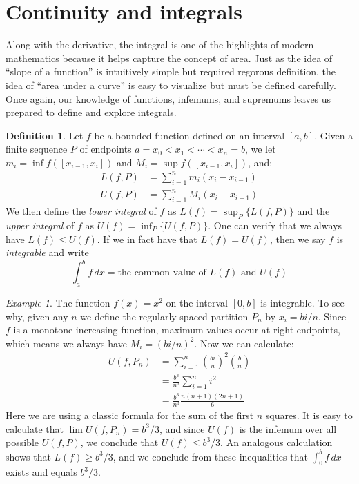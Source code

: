 \documentclass[11pt,oneside]{amsbook}
\theoremstyle{definition}
\theoremstyle{plain}
\theoremstyle{definition}
\newtheorem{defn}[thm]{Definition}
\theoremstyle{remark}
\newtheorem{example}[thm]{Example}
\numberwithin{equation}{section}
\numberwithin{figure}{section}
\begin{document}
\newpage
\section{Continuity and integrals}

Along with the derivative, the integral is one of the highlights of modern mathematics because it helps capture the concept of area. Just as the idea of ``slope of a function'' is intuitively simple but required regorous definition, the idea of ``area under a curve'' is easy to visualize but must be defined carefully. Once again, our knowledge of functions, infemums, and supremums leaves us prepared to define and explore integrals.

\begin{defn}
  Let $f$ be a bounded function defined on an interval $[a,b]$. Given a finite sequence $P$ of endpoints $a=x_0<x_1<\cdots<x_n=b$, we let $m_i=\inf f([x_{i-1},x_i])$ and $M_i=\sup f([x_{i-1},x_i])$, and:
  \begin{align*}
    L(f,P)&=\sum_{i=1}^n m_i(x_i-x_{i-1})\\
    U(f,P)&=\sum_{i=1}^n M_i(x_i-x_{i-1})
  \end{align*}
  We then define the \emph{lower integral} of $f$ as $L(f)=\sup_P\{L(f,P)\}$ and the \emph{upper integral} of $f$ as $U(f)=\inf_P\{U(f,P)\}$. One can verify that we always have $L(f)\leq U(f)$. If we in fact have that $L(f)=U(f)$, then we say $f$ is \emph{integrable} and write
  \[\int_a^bf\,dx=\text{the common value of }L(f)\text{ and }U(f)
  \]
\end{defn}

\begin{example}
  The function $f(x)=x^2$ on the interval $[0,b]$ is integrable. To see why, given any $n$ we define the regularly-spaced partition $P_n$ by $x_i=bi/n$. Since $f$ is a monotone increasing function, maximum values occur at right endpoints, which means we always have $M_i=(bi/n)^2$. Now we can calculate:
  \begin{align*}
    U(f,P_n)&=\sum_{i=1}^n\left(\frac{bi}{n}\right)^2\left(\frac{b}{n}\right)\\
    &=\frac{b^3}{n^3}\sum_{i=1}^n i^2\\
    &=\frac{b^3}{n^3}\frac{n(n+1)(2n+1)}{6}
  \end{align*}
  Here we are using a classic formula for the sum of the first $n$ squares. It is easy to calculate that $\lim U(f,P_n)=b^3/3$, and since $U(f)$ is the infemum over all possible $U(f,P)$, we conclude that $U(f)\leq b^3/3$. An analogous calculation shows that $L(f)\geq b^3/3$, and we conclude from these inequalities that $\int_0^bf\,dx$ exists and equals $b^3/3$.
\end{example}
\end{document}
